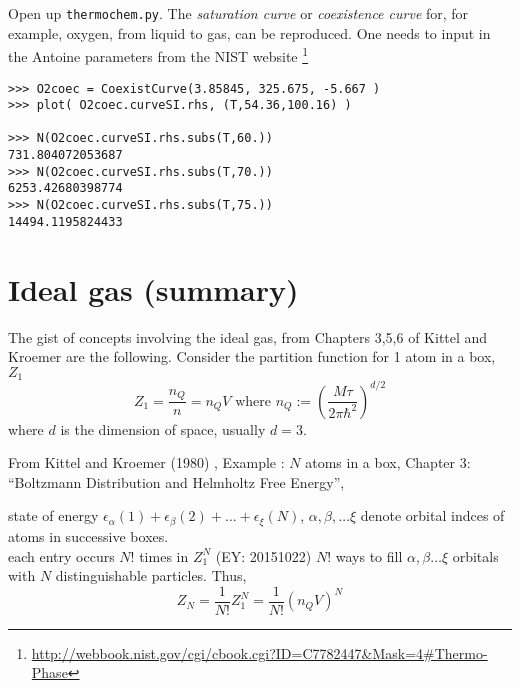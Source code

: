 \documentclass[10pt]{amsart}
\begin{document}
\begin{multicols*}{2}
Open up \verb|thermochem.py|.  The \emph{saturation curve} or \emph{coexistence curve} for, for example, oxygen, from liquid to gas, can be reproduced.  One needs to input in the Antoine parameters from the NIST website \footnote{\url{http://webbook.nist.gov/cgi/cbook.cgi?ID=C7782447&Mask=4\#Thermo-Phase}}

\begin{lstlisting}
>>> O2coec = CoexistCurve(3.85845, 325.675, -5.667 )                                            
>>> plot( O2coec.curveSI.rhs, (T,54.36,100.16) )   

>>> N(O2coec.curveSI.rhs.subs(T,60.))
731.804072053687
>>> N(O2coec.curveSI.rhs.subs(T,70.))
6253.42680398774
>>> N(O2coec.curveSI.rhs.subs(T,75.))
14494.1195824433
\end{lstlisting}



\section{Ideal gas (summary)}

The gist of concepts involving the ideal gas, from Chapters 3,5,6 of Kittel and Kroemer \cite{CKittelHKroemer1980} are the following.  Consider the partition function for 1 atom in a box, $Z_1$
\[
Z_1 = \frac{n_Q}{n} = n_Q V \text{ where } n_Q := \left( \frac{M\tau}{2\pi \hbar^2} \right)^{d/2}
\]
where $d$ is the dimension of space, usually $d=3$.  

From Kittel and Kroemer (1980) \cite{CKittelHKroemer1980}, Example : $N$ atoms in a box, Chapter 3: ``Boltzmann Distribution and Helmholtz Free Energy'', 

state of energy $\epsilon_{\alpha}(1) + \epsilon_{\beta}(2) + \dots + \epsilon_{\xi}(N)$, $\alpha, \beta, \dots \xi$ denote orbital indces of atoms in successive boxes.  \\
each entry occurs $N!$ times in $Z_1^N$ (EY: 20151022) $N!$ ways to fill $\alpha, \beta \dots \xi$ orbitals with $N$ distinguishable particles.  Thus,
\[
Z_N = \frac{1}{N!} Z_1^N = \frac{1}{N!} (n_Q V)^N
\]



\end{multicols*}
\end{document}
